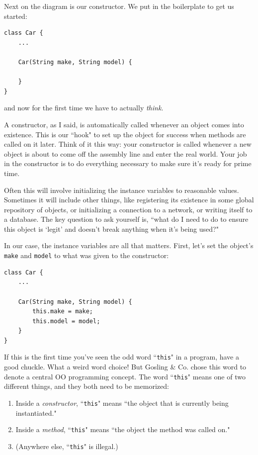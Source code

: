 Next on the diagram is our constructor. We put in the boilerplate to get us
started:

\begin{Verbatim}[samepage=true,fontsize=\footnotesize,frame=single]
class Car {
    ...

    Car(String make, String model) {

    }
}
\end{Verbatim}

and now for the first time we have to actually \textit{think}.

A constructor, as I said, is automatically called whenever an object comes
into existence. This is our ``hook" to set up the object for success when
methods are called on it later. Think of it this way: your constructor is
called whenever a new object is about to come off the assembly line and enter
the real world. Your job in the constructor is to do everything necessary to
make sure it's ready for prime time.

Often this will involve initializing the instance variables to reasonable
values. Sometimes it will include other things, like registering its existence
in some global repository of objects, or initializing a connection to a
network, or writing itself to a database. The key question to ask yourself is,
``what do I need to do to ensure this object is `legit' and doesn't break
anything when it's being used?"

In our case, the instance variables are all that matters. First, let's set the
object's \texttt{make} and \texttt{model} to what was given to the
constructor:

\begin{Verbatim}[samepage=true,fontsize=\footnotesize,frame=single]
class Car {
    ...

    Car(String make, String model) {
        this.make = make;
        this.model = model;
    }
}
\end{Verbatim}
\normalsize

If this is the first time you've seen the odd word ``\texttt{this}" in a
program, have a good chuckle. What a weird word choice! But Gosling \& Co.
chose this word to denote a central OO programming concept. The word
``\texttt{this}" means one of two different things, and they both need to be
memorized:

\begin{enumerate}
\large
\itemsep.1em
\item Inside a \textit{constructor}, ``\texttt{this}" means ``the object that is
currently being instantiated."
\item Inside a \textit{method}, ``\texttt{this}" means ``the object the
method was called on."
\item (Anywhere else, ``\texttt{this}" is illegal.)
\normalsize
\end{enumerate}

